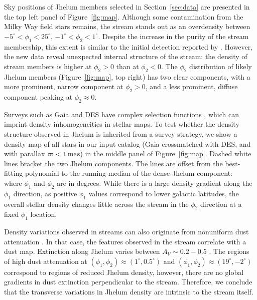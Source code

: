 \documentclass[twocolumn]{aastex62}
\begin{document}
Sky positions of Jhelum members selected in Section~\ref{sec:data} are presented in the top left panel of Figure~\ref{fig:map}.
Although some contamination from the Milky Way field stars remains, the stream stands out as an overdensity between $-5^\circ<\phi_1<25^\circ$, $-1^\circ<\phi_2<1^\circ$.
Despite the increase in the purity of the stream membership, this extent is similar to the initial detection reported by \citet{shipp2018}.
However, the new data reveal unexpected internal structure of the stream: the density of stream members is higher at $\phi_2>0$ than at $\phi_2<0$.
The $\phi_2$ distribution of likely Jhelum members (Figure~\ref{fig:map}, top right) has two clear components, with a more prominent, narrow component at $\phi_2>0$, and a less prominent, diffuse component peaking at $\phi_2\approx0$.

Surveys such as Gaia and DES have complex selection functions \citep[e.g.,][]{bovy2017}, which can imprint density inhomogeneities in stellar maps.
To test whether the density structure observed in Jhelum is inherited from a survey strategy, we show a density map of all stars in our input catalog (Gaia crossmatched with DES, and with parallax $\varpi<1\,\rm mas$) in the middle panel of Figure~\ref{fig:map}.
Dashed white lines bracket the two Jhelum components.
The lines are offset from the best-fitting polynomial to the running median of the dense Jhelum component:
\begin{equation}

\label{eq:track}
\end{equation}
where $\phi_1$ and $\phi_2$ are in degrees.
While there is a large density gradient along the $\phi_1$ direction, as positive $\phi_1$ values correspond to lower galactic latitudes, the overall stellar density changes little across the stream in the $\phi_2$ direction at a fixed $\phi_1$ location.

Density variations observed in streams can also originate from nonuniform dust attenuation \citep[e.g.,][]{ibata2016}.
In that case, the features observed in the stream correlate with a dust map.
Extinction along Jhelum varies between $A_V\sim0.2-0.5$ \citep[Figure~\ref{fig:map}, bottom;][]{sfd}.
The regions of high dust attenuation at $(\phi_1,\phi_2)\approx(1^\circ,0.5^\circ)$ and $(\phi_1,\phi_2)\approx(19^\circ,-2^\circ)$ correspond to regions of reduced Jhelum density, however, there are no global gradients in dust extinction perpendicular to the stream.
Therefore, we conclude that the transverse variations in Jhelum density are intrinsic to the stream itself.
\end{document}
